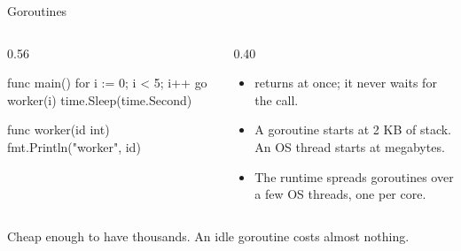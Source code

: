 \documentclass[10pt,aspectratio=169,t]{beamer}
\begin{document}
\begin{frame}[fragile,eyebrow=Goroutines]{Goroutines}
  \begin{columns}[T]
    \begin{column}{0.56\textwidth}
\begin{golang}
func main() {
    for i := 0; i < 5; i++ {
        go worker(i)
    }
    time.Sleep(time.Second)
}

func worker(id int) {
    fmt.Println("worker", id)
}
\end{golang}
    \end{column}
    \begin{column}{0.40\textwidth}
      \begin{itemize}
        \item {} returns at once; it never waits for the call.
        \item A goroutine starts at 2 KB of stack. An OS thread starts at megabytes.
        \item The runtime spreads goroutines over a few OS threads, one per core.
      \end{itemize}
    \end{column}
  \end{columns}
  \begin{takeaway}{Cheap enough to have thousands.}
    An idle goroutine costs almost nothing.
  \end{takeaway}
\end{frame}
\end{document}
